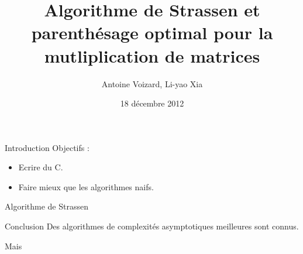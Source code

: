 \documentclass{beamer}
\title[Projet de programmation et d'algorithmique]{
Algorithme de Strassen et parenthésage optimal
pour la mutliplication de matrices}
\author{Antoine Voizard, Li-yao Xia}
\date{18 décembre 2012}
\begin{document}
\begin{frame}
\titlepage
\end{frame}


\begin{frame}{Introduction}
  Objectifs :
  \begin{itemize}
    \item Ecrire du C.
    \item Faire mieux que les algorithmes naifs.
  \end{itemize}
\end{frame}

\begin{frame}{Algorithme de Strassen}
  
\end{frame}



\begin{frame}{Conclusion}
  Des algorithmes de complexités asymptotiques meilleures
  sont connus.

  Mais 
\end{frame}
\end{document}
